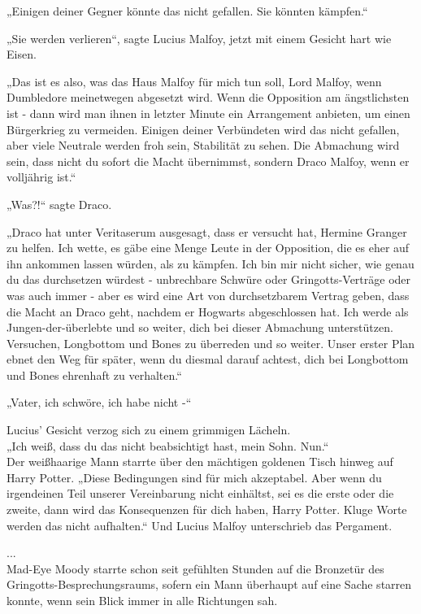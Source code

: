 {„Einigen deiner Gegner könnte das nicht gefallen. Sie könnten kämpfen.“

„Sie werden verlieren“, sagte Lucius Malfoy, jetzt mit einem Gesicht hart wie Eisen.

„Das ist es also, was das Haus Malfoy für mich tun soll, Lord Malfoy, wenn Dumbledore meinetwegen abgesetzt wird. Wenn die Opposition am ängstlichsten ist - dann wird man ihnen in letzter Minute ein Arrangement anbieten, um einen Bürgerkrieg zu vermeiden. Einigen deiner Verbündeten wird das nicht gefallen, aber viele Neutrale werden froh sein, Stabilität zu sehen. Die Abmachung wird sein, dass nicht du sofort die Macht übernimmst, sondern Draco Malfoy, wenn er volljährig ist.“

„Was?!“ sagte Draco.

„Draco hat unter Veritaserum ausgesagt, dass er versucht hat, Hermine Granger zu helfen. Ich wette, es gäbe eine Menge Leute in der Opposition, die es eher auf ihn ankommen lassen würden, als zu kämpfen. Ich bin mir nicht sicher, wie genau du das durchsetzen würdest - unbrechbare Schwüre oder Gringotts-Verträge oder was auch immer - aber es wird eine Art von durchsetzbarem Vertrag geben, dass die Macht an Draco geht, nachdem er Hogwarts abgeschlossen hat. Ich werde als Jungen-der-überlebte und so weiter, dich bei dieser Abmachung unterstützen. Versuchen, Longbottom und Bones zu überreden und so weiter. Unser erster Plan ebnet den Weg für später, wenn du diesmal darauf achtest, dich bei Longbottom und Bones ehrenhaft zu verhalten.“

„Vater, ich schwöre, ich habe nicht -“

Lucius' Gesicht verzog sich zu einem grimmigen Lächeln.\\ „Ich weiß, dass du das nicht beabsichtigt hast, mein Sohn. Nun.“\\ Der weißhaarige Mann starrte über den mächtigen goldenen Tisch hinweg auf Harry Potter. „Diese Bedingungen sind für mich akzeptabel. Aber wenn du irgendeinen Teil unserer Vereinbarung nicht einhältst, sei es die erste oder die zweite, dann wird das Konsequenzen für dich haben, Harry Potter. Kluge Worte werden das nicht aufhalten.“ Und Lucius Malfoy unterschrieb das Pergament.

...\\ Mad-Eye Moody starrte schon seit gefühlten Stunden auf die Bronzetür des Gringotts-Besprechungsraums, sofern ein Mann überhaupt auf eine Sache starren konnte, wenn sein Blick immer in alle Richtungen sah.

}
